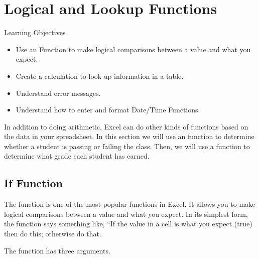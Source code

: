 \section{Logical and Lookup Functions}

\begin{center}
	\begin{objbox}{Learning Objectives}
		\begin{itemize}
			\setlength{\itemsep}{0pt}
			\setlength{\parskip}{0pt}
			\setlength{\parsep}{0pt}

			\item Use an  Function to make logical comparisons between a value and what you expect.
			\item Create a  calculation to look up information in a table.
			\item Understand error messages.
			\item Understand how to enter and format Date/Time Functions.
			
		\end{itemize}
	\end{objbox}
\end{center}

In addition to doing arithmetic, Excel can do other kinds of functions based on the data in your spreadsheet. In this section we will use an  function to determine whether a student is passing or failing the class. Then, we will use a  function to determine what grade each student has earned.

\subsection{If Function}

The  function is one of the most popular functions in Excel. It allows you to make logical comparisons between a value and what you expect. In its simplest form, the  function says something like, ``If the value in a cell is what you expect (true) then do this; otherwise do that.

The  function has three arguments.

